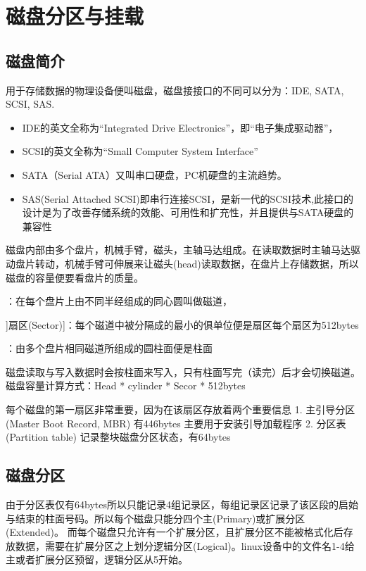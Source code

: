 \section{磁盘分区与挂载}

\subsection{磁盘简介}
用于存储数据的物理设备便叫磁盘，磁盘接接口的不同可以分为：IDE,  SATA, SCSI, SAS.

\begin{itemize}
\item IDE的英文全称为“Integrated Drive Electronics”，即“电子集成驱动器”，
\item SCSI的英文全称为“Small Computer System Interface”
\item SATA（Serial ATA）又叫串口硬盘，PC机硬盘的主流趋势。
\item SAS(Serial Attached SCSI)即串行连接SCSI，是新一代的SCSI技术,此接口的设计是为了改善存储系统的效能、可用性和扩充性，并且提供与SATA硬盘的兼容性
\end{itemize}

磁盘内部由多个盘片，机械手臂，磁头，主轴马达组成。在读取数据时主轴马达驱动盘片转动，机械手臂可伸展来让磁头(head)读取数据，在盘片上存储数据，所以磁盘的容量便要看盘片的质量。

\begin{description}
	\item[磁道(Track)]：在每个盘片上由不同半经组成的同心圆叫做磁道，
	\item]扇区(Sector)]：每个磁道中被分隔成的最小的俱单位便是扇区每个扇区为512bytes
	\item[柱面(Cylinder)]：由多个盘片相同磁道所组成的圆柱面便是柱面
\end{description}

磁盘读取与写入数据时会按柱面来写入，只有柱面写完（读完）后才会切换磁道。
磁盘容量计算方式：Head * cylinder * Secor * 512bytes

每个磁盘的第一扇区非常重要，因为在该扇区存放着两个重要信息
1. 主引导分区(Master Boot Record, MBR) 有446bytes 主要用于安装引导加载程序
2. 分区表(Partition table) 记录整块磁盘分区状态，有64bytes

\subsection{磁盘分区}
由于分区表仅有64bytes所以只能记录4组记录区，每组记录区记录了该区段的启始与结束的柱面号码。所以每个磁盘只能分四个主(Primary)或扩展分区(Extended)。
而每个磁盘只允许有一个扩展分区，且扩展分区不能被格式化后存放数据，需要在扩展分区之上划分逻辑分区(Logical)。linux设备中的文件名1-4给主或者扩展分区预留，逻辑分区从5开始。

